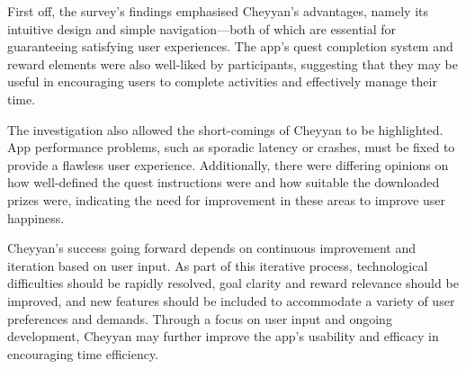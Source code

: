 \documentclass{l4proj}
\begin{document}
First off, the survey's findings emphasised Cheyyan's advantages, namely its intuitive design and simple navigation—both of which are essential for guaranteeing satisfying user experiences. The app's quest completion system and reward elements were also well-liked by participants, suggesting that they may be useful in encouraging users to complete activities and effectively manage their time.

The investigation also allowed the short-comings of Cheyyan to be highlighted. App performance problems, such as sporadic latency or crashes, must be fixed to provide a flawless user experience. Additionally, there were differing opinions on how well-defined the quest instructions were and how suitable the downloaded prizes were, indicating the need for improvement in these areas to improve user happiness.

Cheyyan's success going forward depends on continuous improvement and iteration based on user input. As part of this iterative process, technological difficulties should be rapidly resolved, goal clarity and reward relevance should be improved, and new features should be included to accommodate a variety of user preferences and demands. Through a focus on user input and ongoing development, Cheyyan may further improve the app's usability and efficacy in encouraging time efficiency. 


\end{document}
